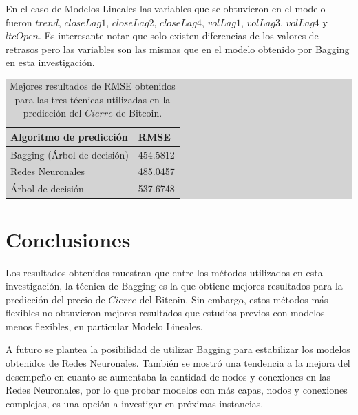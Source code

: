 \documentclass[a4paper,12pt,twocolumn]{article}
\begin{document}
En el caso de Modelos Lineales las variables que se obtuvieron en el modelo fueron $trend$, $closeLag1$, $closeLag2$, $closeLag4$,  $volLag1$, $volLag3$, $volLag4$ y $ltcOpen$. Es interesante notar que solo existen diferencias de los valores de retrasos pero las variables son las mismas que en el modelo obtenido por Bagging en esta investigación. 

\begin{table}[!hbt]
\centering
\caption{Mejores resultados de RMSE obtenidos para las tres técnicas utilizadas en la predicción del $Cierre$ de Bitcoin. }
\label{RMSEFinal}
\begingroup\setlength{\fboxsep}{0pt}
\colorbox{lightgray}{%
\begin{tabular}{|l|l|}
\hline Algoritmo de predicción & RMSE \\
\hline Bagging (Árbol de decisión)& 454.5812\\
\hline Redes Neuronales & 485.0457 \\
\hline Árbol de decisión & 537.6748 \\
\hline
\end{tabular}%
}\endgroup
\end{table}
   
\section{Conclusiones}

Los resultados obtenidos muestran que entre los métodos utilizados en esta investigación, la técnica de Bagging es la que obtiene mejores resultados para la predicción del precio de $Cierre$ del Bitcoin. Sin embargo, estos métodos más flexibles no obtuvieron mejores resultados que estudios previos con modelos menos flexibles, en particular Modelo Lineales. 

A futuro se plantea la posibilidad de utilizar Bagging para estabilizar los modelos obtenidos de Redes Neuronales. También se mostró una tendencia a la mejora del desempeño en cuanto se aumentaba la cantidad de nodos y conexiones en las Redes Neuronales, por lo que probar modelos con más capas, nodos y conexiones complejas, es una opción a investigar en próximas instancias.
     
\end{document}
